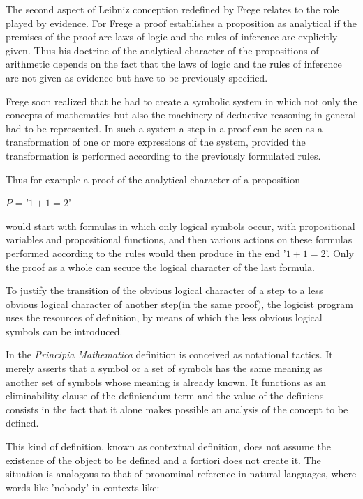 \documentclass[12pt]{article}
\begin{document}
The second aspect of Leibniz conception  redefined by Frege relates to the role played by evidence. For Frege a proof establishes a proposition as analytical if the premises of the proof are laws of logic and the rules of inference are explicitly given. Thus his doctrine of the analytical character of the propositions of arithmetic depends on the fact  that the laws of logic and the rules of inference are not given as evidence but have to be  previously specified.

Frege soon realized that he had to create a symbolic system in which not only the concepts of mathematics but also the machinery of deductive reasoning in general had to be represented. In such a system a step  in a proof can be seen as a transformation of one or more expressions of the system, provided the transformation is performed according to the previously formulated rules.

Thus for example a proof of the analytical character of a proposition

\begin{center}
$P$ = '$1 + 1 = 2$'
\end{center}

would start with formulas in which only  logical symbols occur, with propositional variables and propositional functions, and then  various actions on these formulas performed according to the rules would then  produce in the end  '$1 + 1 = 2$'. Only the proof as a whole  can  secure the  logical character of the last formula.

To justify the transition of the obvious logical character of a step to a less obvious logical character of  another step(in the same proof), the logicist program uses the resources of definition, by means of which the less obvious logical symbols can be introduced.
 
In the \emph{Principia Mathematica} definition is conceived as notational tactics. It merely asserts that a symbol or a set of symbols has the same meaning as another set of symbols whose meaning is already known. It functions as an eliminability clause of the definiendum term and the value of the definiens  consists in the fact that it alone makes possible an analysis of the concept to be defined.
 
This kind of definition, known as contextual definition, does not assume the existence of the object to be defined and a fortiori does not create it. The situation is analogous to that of pronominal reference in natural languages, where words like 'nobody' in contexts like:
\end{document}
